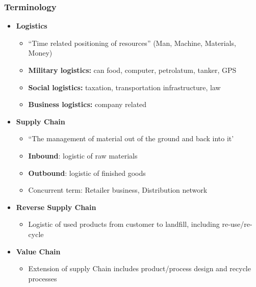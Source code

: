 \documentclass[10pt,handout]{beamer}
\begin{document}
  \begin{frame}
    \frametitle{Terminology}
      \begin{itemize}
        \item<1-> \textbf{Logistics}
        \begin{itemize}
          \item<2-> ``Time related positioning of \alert{resources}'' (Man, Machine, Materials, Money)
          \item<2-> \textbf{Military logistics:} can food, computer, petrolatum, tanker, GPS
          \item<2-> \textbf{Social logistics:} taxation, transportation infrastructure, law
          \item<2-> \textbf{Business logistics:} company related \NextHalfLine
        \end{itemize}
        \item<1-> \textbf{Supply Chain}
        \begin{itemize}
          \item<3-> ``The management of material out of the ground and back into it'
          \item<3-> \textbf{Inbound}: logistic of \alert{raw materials}
          \item<3-> \textbf{Outbound}: logistic of \alert{finished goods}
          \item<3-> Concurrent term: Retailer business, Distribution network \NextHalfLine
        \end{itemize}
        \item<1-> \textbf{Reverse Supply Chain}
        \begin{itemize}
          \item<3-> Logistic of \alert{used products} from customer to landfill, including re-use/re-cycle \NextLine
        \end{itemize}
        \item<1-> \textbf{Value Chain}
        \begin{itemize}
          \item<4-> Extension of supply Chain includes product/process design and recycle processes
        \end{itemize}
    \end{itemize}


\end{frame}
\end{document}

